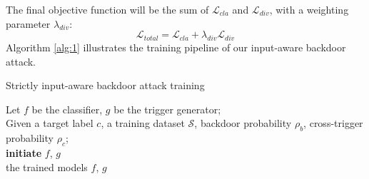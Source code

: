 \documentclass{article}
\begin{document}
The final objective function will be the sum of $\mathcal{L}_{cla}$ and $\mathcal{L}_{div}$, with a weighting parameter $\lambda_{div}$:
\begin{equation*}
    \mathcal{L}_{total} = \mathcal{L}_{cla} + \lambda_{div}\mathcal{L}_{div}
\end{equation*}
Algorithm \ref{alg:1} illustrates the training pipeline of our input-aware backdoor attack.
\begin{algorithm}[t]
\small
  \SetAlgoLined
  \caption{Strictly input-aware backdoor attack training}
  \label{alg:1}
  Let $f$ be the classifier, $g$ be the trigger generator;\\
  Given a target label $c$,  a training dataset $\mathcal{S}$, backdoor probability $\rho_b$, cross-trigger probability $\rho_c$;\\
  \textbf{initiate} $f$, $g$ \\
  \Return the trained models $f$, $g$
\end{algorithm}
\end{document}
